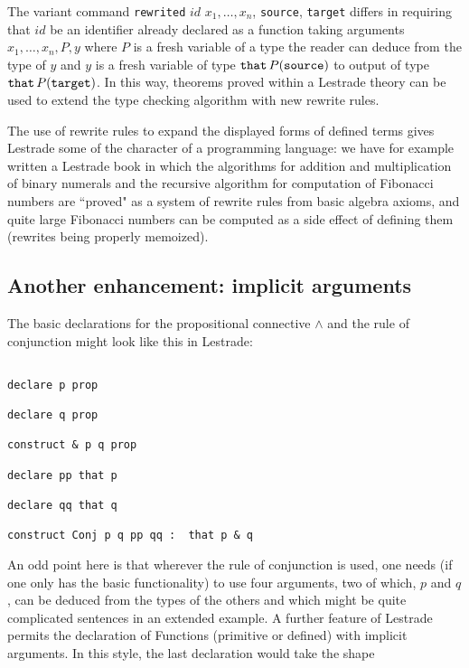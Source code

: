 \documentclass{article}
\begin{document}
The variant command  {\tt rewrited} $id$ $x_1, \ldots, x_n$, {\tt source}, {\tt target} differs in requiring that $id$ be an identifier already declared as a function taking arguments $x_1,\ldots,x_n,P,y$ where $P$ is a fresh variable of a type the reader can deduce from the type of $y$ and $y$ is a fresh variable of type
${\tt that} \,P({\tt source})$ to output of type ${\tt that}\, P({\tt target})$.  In this way, theorems proved within a Lestrade theory can be used to extend the type checking algorithm with new rewrite rules.

The use of rewrite rules to expand the displayed forms of defined terms gives Lestrade some of the character of a programming language:  we have for example written a Lestrade book in which the algorithms for addition and multiplication of binary numerals and the recursive algorithm for computation of Fibonacci numbers are ``proved" as a system of rewrite rules from basic algebra axioms, and quite large Fibonacci numbers can be computed as a side effect of defining them (rewrites being properly memoized).

\subsection{Another enhancement:  implicit arguments}

The basic declarations for the propositional connective $\wedge$ and the rule of conjunction might look like this in Lestrade:

\begin{verbatim}

declare p prop

declare q prop

construct & p q prop

declare pp that p

declare qq that q

construct Conj p q pp qq :  that p & q

\end{verbatim}

An odd point here is that wherever the rule of conjunction is used, one needs (if one only has the basic functionality) to use four arguments, two of which,
$p$ and $q$, can be deduced from the types of the others and which might be quite complicated sentences in an extended example.  A further feature of Lestrade permits the declaration of Functions (primitive or defined) with implicit arguments.  In this style, the last declaration would take the shape
\end{document}
